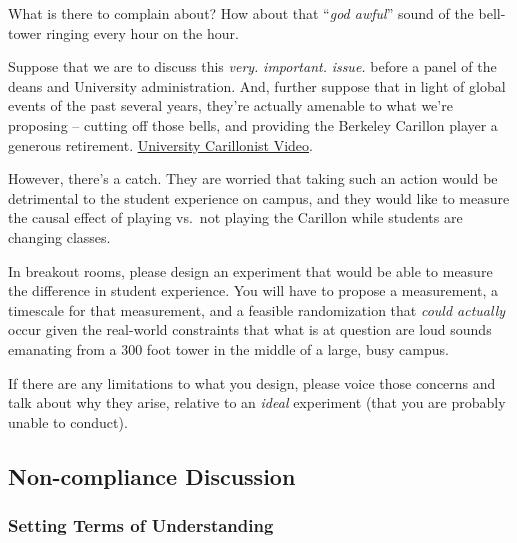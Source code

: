 \documentclass[
]{article}
\theoremstyle{definition}
\theoremstyle{definition}
\theoremstyle{definition}
\theoremstyle{definition}
\theoremstyle{remark}
\begin{document}
What is there to complain about? How about that ``\emph{god awful}'' sound of the bell-tower ringing every hour on the hour.

Suppose that we are to discuss this \emph{very.} \emph{important.} \emph{issue.} before a panel of the deans and University administration. And, further suppose that in light of global events of the past several years, they're actually amenable to what we're proposing -- cutting off those bells, and providing the Berkeley Carillon player a generous retirement. \href{https://www.youtube.com/watch?v=K_8vta9XDpc}{University Carillonist Video}.

However, there's a catch. They are worried that taking such an action would be detrimental to the student experience on campus, and they would like to measure the causal effect of playing vs.~not playing the Carillon while students are changing classes.

In breakout rooms, please design an experiment that would be able to measure the difference in student experience. You will have to propose a measurement, a timescale for that measurement, and a feasible randomization that \emph{could actually} occur given the real-world constraints that what is at question are loud sounds emanating from a 300 foot tower in the middle of a large, busy campus.

If there are any limitations to what you design, please voice those concerns and talk about why they arise, relative to an \emph{ideal} experiment (that you are probably unable to conduct).

\subsection{Non-compliance Discussion}\label{non-compliance-discussion}

\subsubsection{Setting Terms of Understanding}\label{setting-terms-of-understanding}
\end{document}
